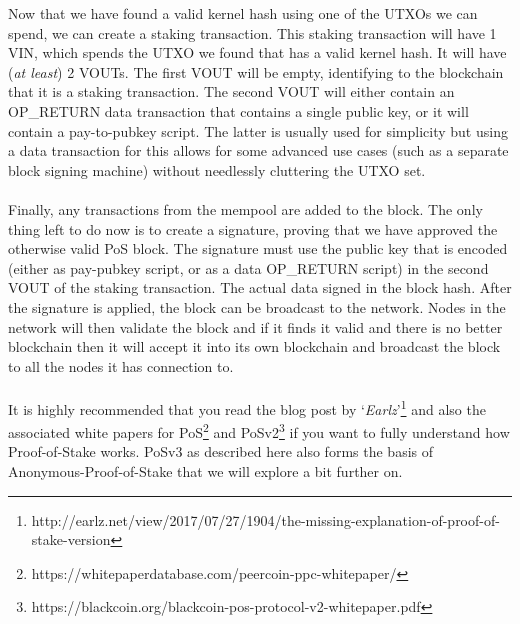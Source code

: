 

\vspace{5mm} %

\newpage
\noindent
Now that we have found a valid kernel hash using one of the UTXOs we can
spend, we can create a staking transaction. This staking transaction will
have 1 VIN, which spends the UTXO we found that has a valid kernel hash.
It will have (\textit{at least}) 2 VOUTs. The first VOUT will be empty,
identifying to the blockchain that it is a staking transaction. The second
VOUT will either contain an OP\_RETURN data transaction that contains a single
public key, or it will contain a pay-to-pubkey script. The latter is usually
used for simplicity but using a data transaction for this allows for some
advanced use cases (such as a separate block signing machine) without
needlessly cluttering the UTXO set.
\\
\\
\noindent
Finally, any transactions from the mempool are added to the block. The only
thing left to do now is to create a signature, proving that we have approved
the otherwise valid PoS block. The signature must use the public key that is
encoded (either as pay-pubkey script, or as a data OP\_RETURN script) in the
second VOUT of the staking transaction. The actual data signed in the block
hash. After the signature is applied, the block can be broadcast to the
network. Nodes in the network will then validate the block and if it finds
it valid and there is no better blockchain then it will accept it into its
own blockchain and broadcast the block to all the nodes it has connection to.
\\
\\
\noindent
It is highly recommended that you read the blog post by
‘\textit{Earlz}’\footnote{http://earlz.net/view/2017/07/27/1904/the-missing-explanation-of-proof-of-stake-version}
and also the associated white papers for
PoS\footnote{https://whitepaperdatabase.com/peercoin-ppc-whitepaper/} and
PoSv2\footnote{https://blackcoin.org/blackcoin-pos-protocol-v2-whitepaper.pdf}
if you want to fully understand how Proof-of-Stake works. PoSv3 as described
here also forms the basis of Anonymous-Proof-of-Stake that we will explore a
bit further on.
